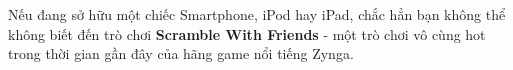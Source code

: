 Nếu đang sở hữu một chiếc Smartphone, iPod hay iPad, chắc hẳn bạn không thể không biết đến trò chơi \textbf{ Scramble With Friends } - một trò chơi vô cùng hot trong thời gian gần đây của hãng game nổi tiếng Zynga.